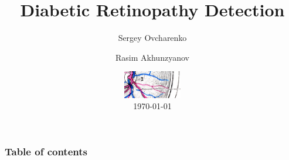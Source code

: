 \documentclass{beamer}
\begin{document}
\title{Diabetic Retinopathy Detection}
\subtitle{}  
\author[]{Sergey Ovcharenko  \and Rasim Akhunzyanov }

\date{\includegraphics[height=1.2cm]{pics/logo} \\ \today} 

\begin{frame}
\titlepage
\end{frame}

\begin{frame}
\frametitle{Table of contents}\tableofcontents
\end{frame} 






%
%
%
\end{document}
